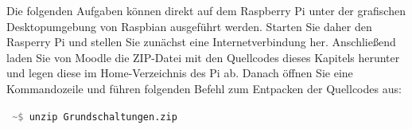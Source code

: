 




\teilaufgabe
Die folgenden Aufgaben können direkt auf dem Raspberry Pi unter der grafischen
Desktopumgebung von Raspbian ausgeführt werden. Starten Sie daher den Rasperry
Pi und stellen Sie zunächst eine Internetverbindung her. Anschließend laden
Sie von Moodle die ZIP-Datei mit den Quellcodes dieses Kapitels herunter und
legen diese im Home-Verzeichnis des Pi ab. Danach öffnen Sie eine Kommandozeile
und führen folgenden Befehl zum Entpacken der Quellcodes aus:

\newcommand*{\CommandPrompt}[1]{\textcolor{gray}{#1}}

{
    \medskip
    \tt
    \CommandPrompt{\~{}\$} unzip Grundschaltungen.zip
    \medskip
}

